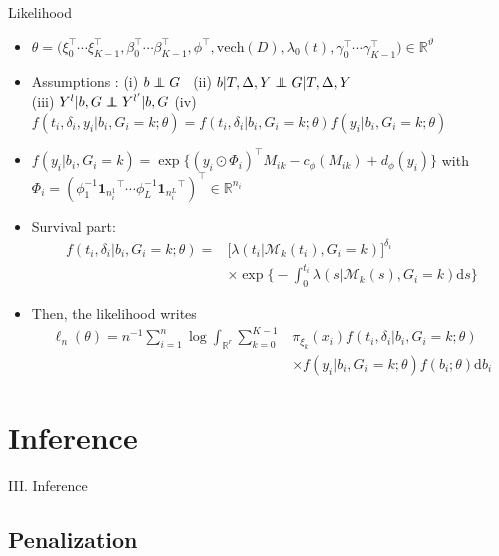 \documentclass{beamer}
\newcommand{\dd}{\mathrm{d}}
\newcommand{\R}{\mathbb R}
\newcommand{\cM}{\mathcal M}
\newcommand\independent{\protect\mathpalette{\protect\independenT}{\perp}}
\def\independenT#1#2{\mathrel{\rlap{$#1#2$}\mkern2mu{#1#2}}}
\begin{document}
\begin{frame}{Likelihood}

\footnotesize
\begin{itemize}
  \item<1-> \scriptsize $\theta = \big(\xi_0^\top \cdots \xi_{K-1}^\top, \beta_0^\top \cdots \beta_{K-1}^\top, \phi^\top, \text{vech}(D), \lambda_0(t), \gamma_0^\top \cdots \gamma_{K-1}^\top\big) \in \R^\vartheta$ 
  \item<2-> Assumptions : (i) $b \independent G$ \ (ii)  $b | T, \Delta, Y \independent G | T, \Delta, Y$ \\ (iii) $Y^l | b, G \independent Y^{l'} | b, G$ (iv) $f(t_i, \delta_i, y_i | b_i, G_i = k ; \theta) = f(t_i, \delta_i| b_i, G_i = k ; \theta) f(y_i | b_i, G_i = k ; \theta)$
  \item<3-> $f(y_i|b_i, G_i=k) = \exp \big\{(y_i \odot \Phi_i)^\top M_{ik} - c_\phi(M_{ik}) + d_\phi(y_i) \big\}$ with $\Phi_i = (\phi_1^{-1} {\textbf{1}_{n_i^1}}^\top \cdots \phi_L^{-1} {\textbf{1}_{n_i^L}}^\top)^\top \in \R^{n_i}$
  \item<4-> Survival part: 
  \begin{align*}f(t_i, \delta_i| b_i, G_i = k ; \theta) = &\big[\lambda(t_i|\cM_k(t_i), G_i = k)\big]^{\delta_i} \\ & \times \exp \Big\{-\int_0^{t_i} \lambda(s|\cM_k(s), G_i = k) \dd s \Big\}
  \end{align*}
  \item<5-> Then, the likelihood writes
  \begin{align*}\ell_n(\theta) = n^{-1} \sum_{i=1}^n \log \int_{\R^r} \sum_{k=0}^{K-1} &\pi_{\xi_k}(x_i) f(t_i, \delta_i| b_i, G_i = k ; \theta) \\ & \times f(y_i | b_i, G_i = k ; \theta) f(b_i ; \theta) \dd b_i
  \end{align*}
\end{itemize}

\end{frame}

\section{Inference}

\begin{frame}[noframenumbering]
\Large \centering
\textcolor{blue_pres}{III.} Inference
\end{frame}

\subsection{Penalization}
\end{document}

